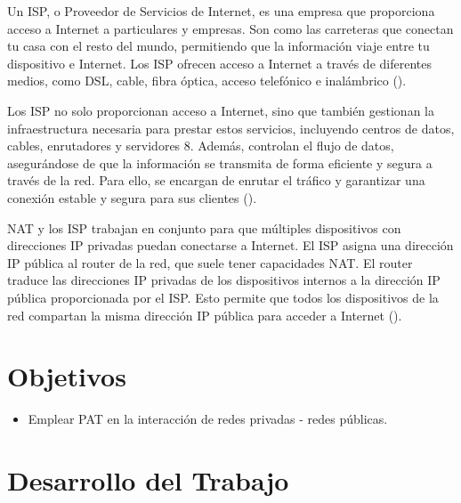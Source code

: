     Un ISP, o Proveedor de Servicios de Internet, es una empresa que proporciona acceso a Internet a particulares y empresas. Son como las carreteras que conectan tu casa con el resto del mundo, permitiendo que la información viaje entre tu dispositivo e Internet. Los ISP ofrecen acceso a Internet a través de diferentes medios, como DSL, cable, fibra óptica, acceso telefónico e inalámbrico (\cite{verizon}).

    Los ISP no solo proporcionan acceso a Internet, sino que también gestionan la infraestructura necesaria para prestar estos servicios, incluyendo centros de datos, cables, enrutadores y servidores 8. Además, controlan el flujo de datos, asegurándose de que la información se transmita de forma eficiente y segura a través de la red. Para ello, se encargan de enrutar el tráfico y garantizar una conexión estable y segura para sus clientes (\cite{waite24}).

    NAT y los ISP trabajan en conjunto para que múltiples dispositivos con direcciones IP privadas puedan conectarse a Internet. El ISP asigna una dirección IP pública al router de la red, que suele tener capacidades NAT. El router traduce las direcciones IP privadas de los dispositivos internos a la dirección IP pública proporcionada por el ISP. Esto permite que todos los dispositivos de la red compartan la misma dirección IP pública para acceder a Internet (\cite{porter01}).

\section{Objetivos}
    \begin{itemize}
        \item Emplear PAT en la interacción de redes privadas - redes públicas.
    \end{itemize}

\section{Desarrollo del Trabajo}
